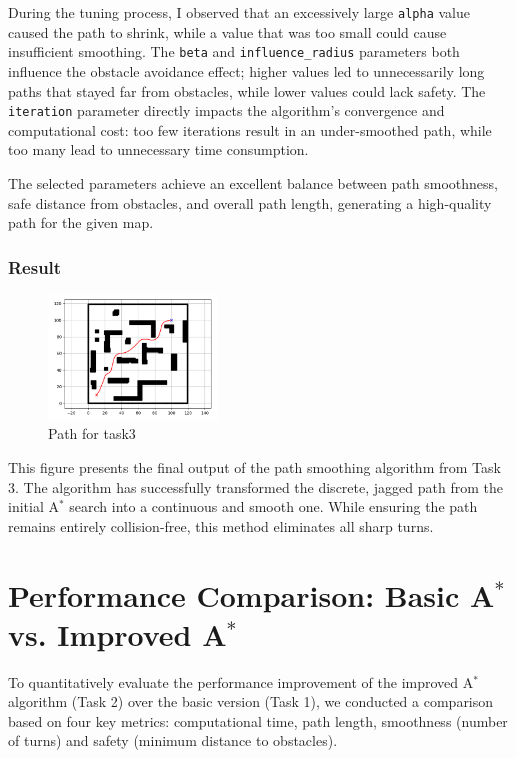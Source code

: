 \documentclass[aps,letterpaper,10pt]{revtex4}
\begin{document}
During the tuning process, I observed that an excessively large \texttt{alpha} value caused the path to shrink, while a value that was too small could cause insufficient smoothing. The \texttt{beta} and \texttt{influence\_radius} parameters both influence the obstacle avoidance effect; higher values led to unnecessarily long paths that stayed far from obstacles, while lower values could lack safety. The \texttt{iteration} parameter directly impacts the algorithm's convergence and computational cost: too few iterations result in an under-smoothed path, while too many lead to unnecessary time consumption. 

The selected parameters achieve an excellent balance between path smoothness, safe distance from obstacles, and overall path length, generating a high-quality path for the given map.

\subsubsection{Result}
\begin{figure}[h!]
	\centering %
	\includegraphics[width=0.4\textwidth]{task3.png} %
	\caption{Path for task3} %
	\label{fig:logo} %
\end{figure}
This figure presents the final output of the path smoothing algorithm from Task 3. The algorithm has successfully transformed the discrete, jagged path from the initial A$^*$ search into a continuous and smooth one. While ensuring the path remains entirely collision-free, this method eliminates all sharp turns. %
\newpage
\section{Performance Comparison: Basic A$^*$ vs. Improved A$^*$}

To quantitatively evaluate the performance improvement of the improved A$^*$ algorithm (Task 2) over the basic version (Task 1), we conducted a comparison based on four key metrics: computational time, path length, smoothness (number of turns) and safety (minimum distance to obstacles). 
\end{document}
